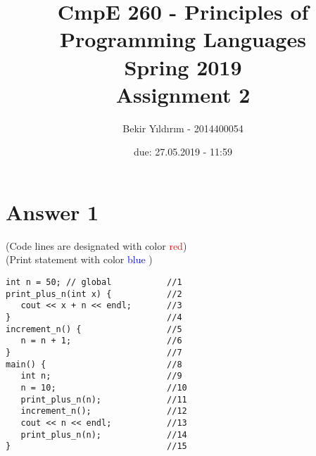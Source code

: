 \documentclass{article}
\title{CmpE 260 - Principles of Programming Languages \\Spring 2019 \\Assignment 2}
\author{Bekir Yıldırım - 2014400054}
\date{due: 27.05.2019 - 11:59}
\begin{document}
\maketitle

\section*{Answer 1}
(Code lines are designated with color \textcolor{red}{red})
\\(Print statement with color \textcolor{blue}{blue} )
\begin{lstlisting}
int n = 50; // global           //1
print_plus_n(int x) {           //2
   cout << x + n << endl;       //3
}                               //4
increment_n() {                 //5
   n = n + 1;                   //6
}                               //7
main() {                        //8
   int n;                       //9
   n = 10;                      //10
   print_plus_n(n);             //11
   increment_n();               //12
   cout << n << endl;           //13
   print_plus_n(n);             //14
}                               //15
\end{lstlisting} \\~\\ 
\end{document}
